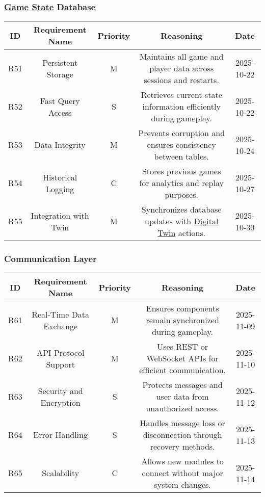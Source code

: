 \documentclass{article}
\newcommand{\DigitalTwin}{\href{https://en.wikipedia.org/wiki/Digital_twin}{Digital Twin}}
\newcommand{\GameState}{\href{https://milvus.io/ai-quick-reference/what-is-a-state-in-rl}{Game State}}
\begin{document}
\vspace{1em}

\subsubsection*{\GameState{} Database}

\begin{tabular}{|c|c|c|c|c|}
\hline
\textbf{ID} & \textbf{Requirement Name} & \textbf{Priority} &
\textbf{Reasoning} & \textbf{Date} \\
\hline
R51 & Persistent Storage & M &
\parbox[t]{4cm}{Maintains all game and player data across sessions
and restarts.} &
2025-10-22 \\
\hline
R52 & Fast Query Access & S &
\parbox[t]{4cm}{Retrieves current state information efficiently
during gameplay.} &
2025-10-22 \\
\hline
R53 & Data Integrity & M &
\parbox[t]{4cm}{Prevents corruption and ensures consistency between
tables.} &
2025-10-24 \\
\hline
R54 & Historical Logging & C &
\parbox[t]{4cm}{Stores previous games for analytics and replay
purposes.} &
2025-10-27 \\
\hline
R55 & Integration with Twin & M &
\parbox[t]{4cm}{Synchronizes database updates with \DigitalTwin{}
actions.} &
2025-10-30 \\
\hline
\end{tabular}

\vspace{1em}

\subsubsection*{Communication Layer}

\begin{tabular}{|c|c|c|c|c|}
\hline
\textbf{ID} & \textbf{Requirement Name} & \textbf{Priority} &
\textbf{Reasoning} & \textbf{Date} \\
\hline
R61 & Real-Time Data Exchange & M &
\parbox[t]{4cm}{Ensures components remain synchronized during
gameplay.} &
2025-11-09 \\
\hline
R62 & API Protocol Support & M &
\parbox[t]{4cm}{Uses REST or WebSocket APIs for efficient
communication.} &
2025-11-10 \\
\hline
R63 & Security and Encryption & S &
\parbox[t]{4cm}{Protects messages and user data from unauthorized
access.} &
2025-11-12 \\
\hline
R64 & Error Handling & S &
\parbox[t]{4cm}{Handles message loss or disconnection through
recovery methods.} &
2025-11-13 \\
\hline
R65 & Scalability & C &
\parbox[t]{4cm}{Allows new modules to connect without major system
changes.} &
2025-11-14 \\
\hline
\end{tabular}
\end{document}
